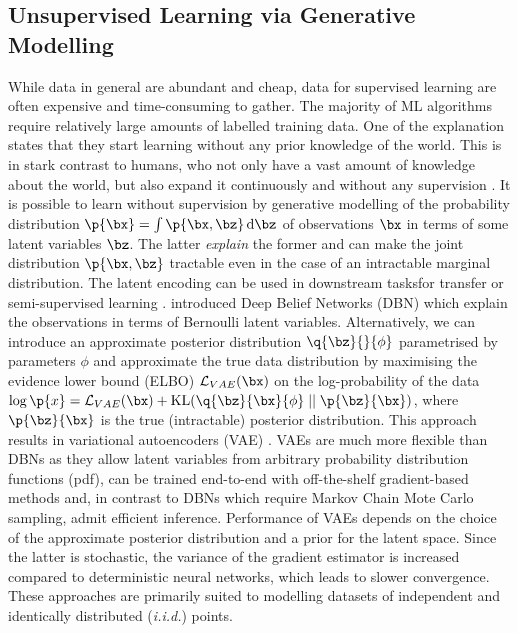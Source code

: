     \subsection{Unsupervised Learning via Generative Modelling}
       While data in general are abundant and cheap, data for supervised learning are often expensive and time-consuming to gather. The majority of ML algorithms require relatively large amounts of labelled training data. One of the explanation  states that they start learning without any prior knowledge of the world. This is in stark contrast to humans, who not only have a vast amount of knowledge about the world, but also expand it continuously and without any supervision \citep{Friston2009guide}. It is possible to learn without supervision by generative modelling of the probability distribution $\p{\bx} = \int \p{\bx, \bz} \dint \bz$ of observations $\bx$ in terms of some latent variables $\bz$. The latter \emph{explain} the former and can make the joint distribution $\p{\bx, \bz}$ tractable even in the case of an intractable marginal distribution. The latent encoding can be used in downstream tasks\eg for transfer or semi-supervised learning \citep{Pan2010}. \cite{Hinton2006dbn} introduced Deep Belief Networks (DBN) which explain the observations in terms of Bernoulli latent variables. Alternatively, we can introduce an approximate posterior distribution $\q{\bz}{}{\phi}$ parametrised by parameters $\phi$ and approximate the true data distribution by maximising the evidence lower bound (ELBO) $\loss[VAE]{\bx}$ on the log-probability of the data $\log \p{x} = \loss[VAE]{\bx} + \kl{ \q{\bz}{\bx}{\phi} }{ \p{\bz}{\bx} }$, where $\p{\bz}{\bx}$ is the true (intractable) posterior distribution. This approach results in variational autoencoders (VAE) \citep{Kingma2014,Rezende2014}. VAEs are much more flexible than DBNs as they allow latent variables from arbitrary probability distribution functions (pdf), can be trained end-to-end with off-the-shelf gradient-based methods and, in contrast to DBNs which require Markov Chain Mote Carlo sampling, admit efficient inference. Performance of VAEs depends on the choice of the approximate posterior distribution and a prior for the latent space. Since the latter is stochastic, the variance of the gradient estimator is increased compared to deterministic neural networks, which leads to slower convergence. These approaches are primarily suited to modelling datasets of independent and identically distributed (\emph{i.i.d.}) points.
       
